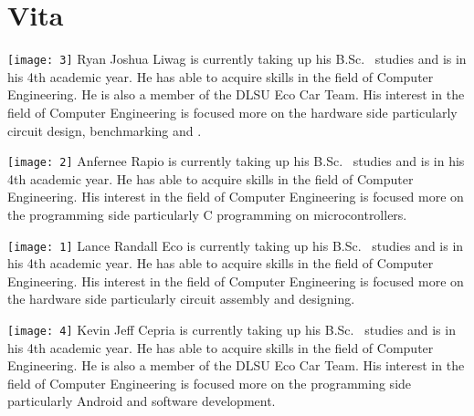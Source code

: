 \chapter{Vita}


\vfill

\vspace{5mm}
\texttt{[image: 3]}
Ryan Joshua Liwag is currently taking up his B.Sc. \degree \ studies and is in his 4th academic year. He has able to acquire skills in the field of Computer Engineering. He is also a member of the DLSU Eco Car Team. His interest in the field of Computer Engineering is focused more on the hardware side particularly circuit design, benchmarking and  .

\vspace{5mm}
\texttt{[image: 2]}
Anfernee Rapio is currently taking up his B.Sc. \degree \ studies and is in his 4th academic year. He has able to acquire skills in the field of Computer Engineering. His interest in the field of Computer Engineering is focused more on the programming side particularly C programming on microcontrollers.

\vspace{5mm}
\texttt{[image: 1]}
Lance Randall Eco is currently taking up his B.Sc. \degree \ studies and is in his 4th academic year. He has able to acquire skills in the field of Computer Engineering. His interest in the field of Computer Engineering is focused more on the hardware side particularly circuit assembly and designing.

\vspace{5mm}
\texttt{[image: 4]}
Kevin Jeff Cepria is currently taking up his B.Sc. \degree \ studies and is in his 4th academic year. He has able to acquire skills in the field of Computer Engineering. He is also a member of the DLSU Eco Car Team. His interest in the field of Computer Engineering is focused more on the programming side particularly Android and software development.




\vfill
